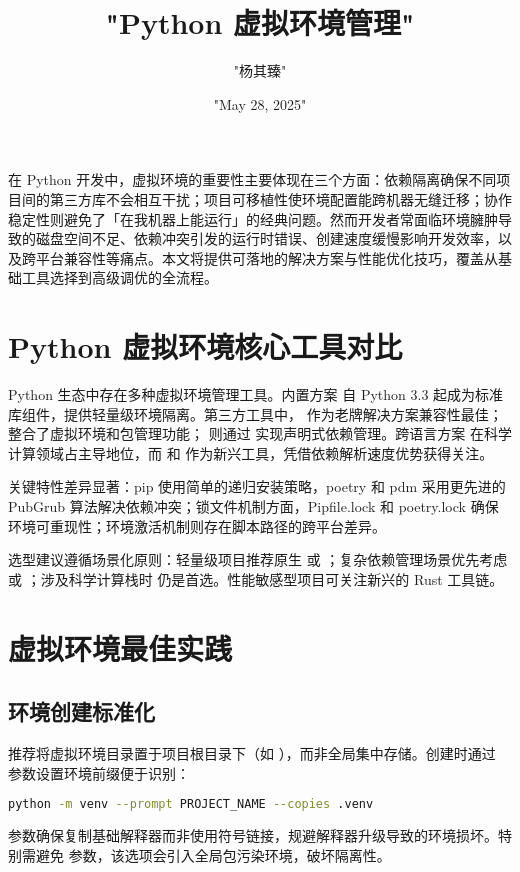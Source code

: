 \title{"Python 虚拟环境管理"}
\author{"杨其臻"}
\date{"May 28, 2025"}
\maketitle
在 Python 开发中，虚拟环境的重要性主要体现在三个方面：依赖隔离确保不同项目间的第三方库不会相互干扰；项目可移植性使环境配置能跨机器无缝迁移；协作稳定性则避免了「在我机器上能运行」的经典问题。然而开发者常面临环境臃肿导致的磁盘空间不足、依赖冲突引发的运行时错误、创建速度缓慢影响开发效率，以及跨平台兼容性等痛点。本文将提供可落地的解决方案与性能优化技巧，覆盖从基础工具选择到高级调优的全流程。\par
\chapter{Python 虚拟环境核心工具对比}
Python 生态中存在多种虚拟环境管理工具。内置方案  自 Python 3.3 起成为标准库组件，提供轻量级环境隔离。第三方工具中， 作为老牌解决方案兼容性最佳； 整合了虚拟环境和包管理功能； 则通过  实现声明式依赖管理。跨语言方案  在科学计算领域占主导地位，而  和  作为新兴工具，凭借依赖解析速度优势获得关注。\par
关键特性差异显著：pip 使用简单的递归安装策略，poetry 和 pdm 采用更先进的 PubGrub 算法解决依赖冲突；锁文件机制方面，Pipfile.lock 和 poetry.lock 确保环境可重现性；环境激活机制则存在脚本路径的跨平台差异。\par
选型建议遵循场景化原则：轻量级项目推荐原生  或 ；复杂依赖管理场景优先考虑  或 ；涉及科学计算栈时  仍是首选。性能敏感型项目可关注新兴的 Rust 工具链。\par
\chapter{虚拟环境最佳实践}
\section{环境创建标准化}
推荐将虚拟环境目录置于项目根目录下（如 ），而非全局集中存储。创建时通过  参数设置环境前缀便于识别：\par
\begin{lstlisting}[language=bash]
python -m venv --prompt PROJECT_NAME --copies .venv
\end{lstlisting}
 参数确保复制基础解释器而非使用符号链接，规避解释器升级导致的环境损坏。特别需避免  参数，该选项会引入全局包污染环境，破坏隔离性。\par
